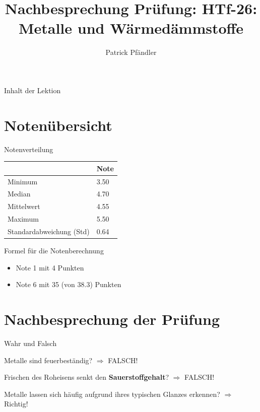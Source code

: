 
\usepackage{fontawesome}  %


\title{\textbf{Nachbesprechung Prüfung: HTf-26: Metalle und Wärmedämmstoffe}}
\author{Patrick Pfändler}






\frame{\titlepage}

\begin{frame}{Inhalt der Lektion}
    \tableofcontents
\end{frame}


\section{Notenübersicht}
\begin{frame}{Notenverteilung}
    \begin{table}[h!]
        \centering
        \label{tab:statistische_werte}
        \begin{tabular}{ll}
            \hline
            \textbf{{}} & \textbf{Note} \\ \hline
            Minimum & 3.50 \\
            Median & 4.70 \\
            Mittelwert & 4.55 \\
            Maximum & 5.50 \\
            Standardabweichung (Std) & 0.64 \\ \hline
        \end{tabular}
    \end{table}
\end{frame}


\begin{frame}{Formel für die Notenberechnung}
    \begin{itemize}
        \item[\textbullet] Note 1 mit 4 Punkten
        \item[\textbullet] Note 6 mit 35 (von 38.3) Punkten  
    \end{itemize}
\end{frame}

\section{Nachbesprechung der Prüfung}
\begin{frame}{Wahr und Falsch}

    Metalle sind feuerbeständig? $\Rightarrow$ FALSCH! 

    \vspace{\baselineskip} 

    Frischen des Roheisens senkt den \textbf{Sauerstoffgehalt}?
    $\Rightarrow$ FALSCH!

    \vspace{\baselineskip} 
    
    Metalle lassen sich häufig aufgrund ihres typischen Glanzes erkennen? 
    $\Rightarrow$ Richtig!
\end{frame}


